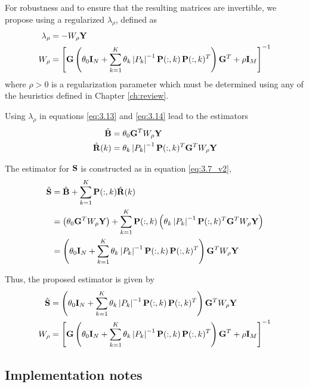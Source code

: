 For robustness and to ensure that the resulting matrices are invertible, we propose using a regularized $\lambda_\rho$, defined as
\begin{align}
    \lambda_\rho &= -W_\rho  \mathbf{Y} 
    \\
    W_\rho &=
    \left[ \mathbf{G} \left(  \theta_0 \mathbf{I}_N + \sum_{k=1}^K \theta_k \left| {P_k} \right|^{-1} 
    \mathbf{P}(:,k)\, \mathbf{P}(:,k)^T
     \right) \mathbf{G}^T + \rho \mathbf{I}_M  \right]^{-1}
\end{align}
where $\rho>0$ is a regularization parameter which must be determined using any of the heuristics defined in Chapter \ref{ch:review}.

Using $\lambda_\rho$ in equations \eqref{eq:3.13} and \eqref{eq:3.14} lead to the estimators
\begin{align}
    \hat{\mathbf{B}} &=
    \theta_0 \mathbf{G}^T W_\rho \mathbf{Y}
    \\
    \hat{\mathbf{R}}(k) &=
    \theta_k \left| {P_k} \right|^{-1} \mathbf{P}(:,k)^T \mathbf{G}^T W_\rho \mathbf{Y}
\end{align}

The estimator for $\mathbf{S}$ is constructed as in equation \eqref{eq:3.7_v2},
\begin{align}
    \hat{\mathbf{S}}
    &=
    \hat{\mathbf{B}} + \sum_{k=1}^K \mathbf{P}(:,k) \hat{\mathbf{R}}(k)
    \nonumber \\
    &=
    \left( \theta_0 \mathbf{G}^T W_\rho \mathbf{Y} \right)
    + \sum_{k=1}^K \mathbf{P}(:,k) \left( \theta_k \left| {P_k} \right|^{-1} \mathbf{P}(:,k)^T \mathbf{G}^T W_\rho \mathbf{Y} \right)
    \nonumber \\
    &=
    \left(  \theta_0 \mathbf{I}_N + \sum_{k=1}^K \theta_k \left| {P_k} \right|^{-1} 
    \mathbf{P}(:,k)\, \mathbf{P}(:,k)^T
     \right) \mathbf{G}^T W_\rho \mathbf{Y}
\end{align}

Thus, the proposed estimator is given by
\begin{align}
    \hat{\mathbf{S}}
    &=
    \left(  \theta_0 \mathbf{I}_N + \sum_{k=1}^K \theta_k \left| {P_k} \right|^{-1} 
    \mathbf{P}(:,k)\, \mathbf{P}(:,k)^T
     \right) \mathbf{G}^T W_\rho \mathbf{Y}
    \label{eq:3.24}
    \\
    W_\rho &=
    \left[ \mathbf{G} \left(  \theta_0 \mathbf{I}_N + \sum_{k=1}^K \theta_k \left| {P_k} \right|^{-1} 
    \mathbf{P}(:,k)\, \mathbf{P}(:,k)^T
     \right) \mathbf{G}^T + \rho \mathbf{I}_M  \right]^{-1}
    \label{eq:3.25}
\end{align}

\subsection{Implementation notes}


